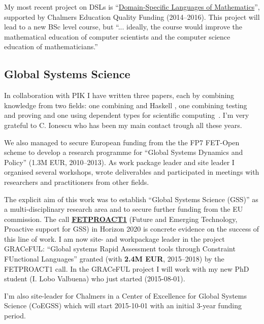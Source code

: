 My most recent project on DSLs is
``\href{http://wiki.portal.chalmers.se/cse/pmwiki.php/FP/DSLsofMath}{Domain-Specific
  Languages of Mathematics}'', supported by Chalmers Education Quality
Funding (2014--2016).
%
This project will lead to a new BSc level course, but ``... ideally,
the course would improve the mathematical education of computer
scientists and the computer science education of mathematicians.''

\subsection{Global Systems Science}\label{sec:GSS}

In collaboration with PIK I have written three papers, each by
combining knowledge from two fields: one combining \Cpp{} and Haskell
\citep{LinckeJanssonetalDSLWC2009}, one combining testing and proving
\citep{ionescujansson:LIPIcs:2013:3899} and one using dependent types
for scientific computing~\citep{ionescujansson2013DTPinSciComp}.
%
I'm very grateful to C. Ionescu who has been my main contact trough
all these years.

We also managed to secure European funding from the the FP7 FET-Open
scheme to develop a research programme for ``Global Systems Dynamics
and Policy'' (1.3M EUR, 2010--2013).
%
As work package leader and site leader I organised several workshops,
wrote deliverables and participated in meetings with researchers and
practitioners from other fields.

The explicit aim of this work was to establish ``Global Systems
Science (GSS)'' as a multi-disciplinary research area and to secure further
funding from the EU commission.
%
The call
\textbf{\href{http://ec.europa.eu/research/participants/portal/desktop/en/opportunities/h2020/topics/2074-fetproact-1-2014.html}{FETPROACT1}}
(Future and Emerging Technology, Proactive support for GSS) in Horizon
2020 is concrete evidence on the success of this line of work.
%
I am now site- and workpackage leader in the project GRACeFUL:
``Global systems Rapid Assessment tools through Constraint FUnctional
Languages'' granted (with \textbf{2.4M EUR}, 2015--2018) by the
FETPROACT1 call.
%
In the GRACeFUL project I will work with my new PhD student (I. Lobo
Valbuena) who just started (2015-08-01).

I'm also site-leader for Chalmers in a Center of Excellence for Global
Systems Science (CoEGSS) which will start 2015-10-01 with an initial
3-year funding period.

